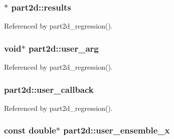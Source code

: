 \subsubsection[{\texorpdfstring{results}{results}}]{$\ast$ part2d\+::results}\hypertarget{structpart2d_a5ac128b4b2fd467b649402dbc4eaaffc}{}\label{structpart2d_a5ac128b4b2fd467b649402dbc4eaaffc}


Referenced by part2d\+\_\+regression().

\subsubsection[{\texorpdfstring{user\+\_\+arg}{user_arg}}]{\setlength{\rightskip}{0pt plus 5cm}void$\ast$ part2d\+::user\+\_\+arg}\hypertarget{structpart2d_a90ef8ea6d957e6071da0d194604882d2}{}\label{structpart2d_a90ef8ea6d957e6071da0d194604882d2}


Referenced by part2d\+\_\+regression().

\subsubsection[{\texorpdfstring{user\+\_\+callback}{user_callback}}]{ part2d\+::user\+\_\+callback}\hypertarget{structpart2d_a112f610839d74b0af24794c7442f87a9}{}\label{structpart2d_a112f610839d74b0af24794c7442f87a9}


Referenced by part2d\+\_\+regression().

\subsubsection[{\texorpdfstring{user\+\_\+ensemble\+\_\+x}{user_ensemble_x}}]{\setlength{\rightskip}{0pt plus 5cm}const double$\ast$ part2d\+::user\+\_\+ensemble\+\_\+x}\hypertarget{structpart2d_ad32ef0508bbc66d928719df1b12f7387}{}\label{structpart2d_ad32ef0508bbc66d928719df1b12f7387}
